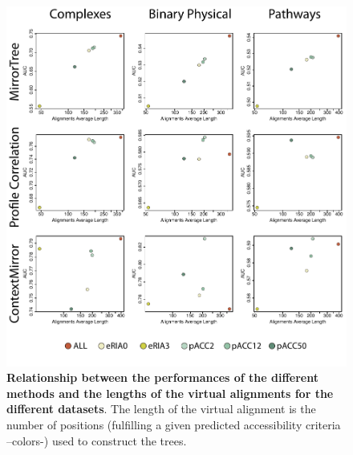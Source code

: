 \begin{figure}[htbp]
\centering
\includegraphics[keepaspectratio,width=\textwidth,height=0.75\textheight]{../figures/accsAlnLength_full.pdf}
\caption{\textbf{Relationship between the performances of the different methods and the lengths of the virtual alignments for the different datasets}. The length of the virtual alignment is the number of positions (fulfilling a given predicted accessibility criteria –colors-) used to construct the trees.}
\label{accsalnlength_full.pdf}
\end{figure}


